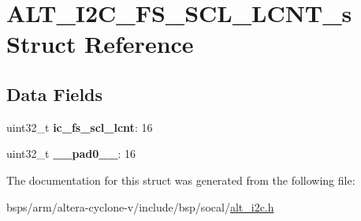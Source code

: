 \hypertarget{structALT__I2C__FS__SCL__LCNT__s}{}\section{A\+L\+T\+\_\+\+I2\+C\+\_\+\+F\+S\+\_\+\+S\+C\+L\+\_\+\+L\+C\+N\+T\+\_\+s Struct Reference}
\label{structALT__I2C__FS__SCL__LCNT__s}
\subsection*{Data Fields}
\begin{DoxyCompactItemize}
\item 
\mbox{\label{structALT__I2C__FS__SCL__LCNT__s_a95961fd30f67b55d32e7ac08906d5be0}} 
uint32\+\_\+t {\bfseries ic\+\_\+fs\+\_\+scl\+\_\+lcnt}\+: 16
\item 
\mbox{\label{structALT__I2C__FS__SCL__LCNT__s_a1386b6676aa20138057d6771b4534f12}} 
uint32\+\_\+t {\bfseries \+\_\+\+\_\+pad0\+\_\+\+\_\+}\+: 16
\end{DoxyCompactItemize}


The documentation for this struct was generated from the following file\+:\begin{DoxyCompactItemize}
\item 
bsps/arm/altera-\/cyclone-\/v/include/bsp/socal/\mbox{\hyperlink{socal_2alt__i2c_8h}{alt\+\_\+i2c.\+h}}\end{DoxyCompactItemize}
